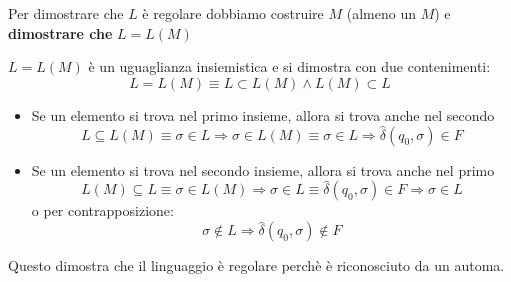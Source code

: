 \documentclass[a4paper]{article}
\begin{document}
\vspace{1em}
\noindent
\begin{definition}
  Per dimostrare che \( L \) è regolare dobbiamo costruire \( M \) (almeno un \( M \)) e
  \textbf{dimostrare che} \( L = L(M) \) 
\end{definition}
\( L = L(M) \) è un uguaglianza insiemistica e si dimostra con due contenimenti:
\[
  L = L(M) \equiv L \subset L(M) \wedge L(M) \subset L
\]  
\begin{itemize}
  \item Se un elemento si trova nel primo insieme, allora si trova anche nel secondo
    \[
      L \subseteq L(M) \equiv \sigma \in L \Rightarrow \sigma \in L(M) \equiv
      \sigma \in L \Rightarrow \hat{\delta}(q_0, \sigma) \in F
    \] 
  \item Se un elemento si trova nel secondo insieme, allora si trova anche nel primo
    \[
      L(M) \subseteq L \equiv \sigma \in L(M) \Rightarrow \sigma \in L \equiv
      \hat{\delta}(q_0, \sigma) \in F \Rightarrow \sigma \in L
    \]
    o per contrapposizione:
    \[
      \sigma \notin L \Rightarrow \hat{\delta}(q_0, \sigma) \notin F
    \] 
\end{itemize}
Questo dimostra che il linguaggio è regolare perchè è riconosciuto da un automa.
\end{document}
